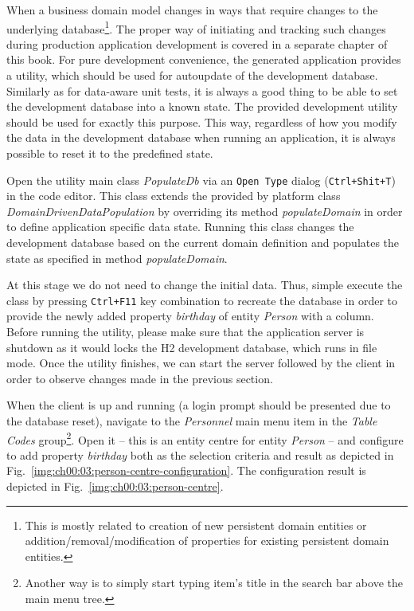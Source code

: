   When a business domain model changes in ways that require changes to the underlying database\footnote{This is mostly related to creation of new persistent domain entities or addition/removal/modification of properties for existing persistent domain entities.}.
  The proper way of initiating and tracking such changes during production application development is covered in a separate chapter of this book.
  For pure development convenience, the generated application provides a utility, which should be used for autoupdate of the development database.
  Similarly as for data-aware unit tests, it is always a good thing to be able to set the development database into a known state.
  The provided development utility should be used for exactly this purpose.
  This way, regardless of how you modify the data in the development database when running an application, it is always possible to reset it to the predefined state.

  Open the utility main class \emph{PopulateDb} via an \texttt{Open Type} dialog (\texttt{Ctrl+Shit+T}) in the code editor.
  This class extends the provided by platform class \emph{DomainDrivenDataPopulation} by overriding its method \emph{populateDomain} in order to define application specific data state.
  Running this class changes the development database based on the current domain definition and populates the state as specified in method \emph{populateDomain}.

  At this stage we do not need to change the initial data.
  Thus, simple execute the class by pressing \texttt{Ctrl+F11} key combination to recreate the database in order to provide the newly added property \emph{birthday} of entity \emph{Person} with a column.
  Before running the utility, please make sure that the application server is shutdown as it would locks the H2 development database, which runs in file mode.
  Once the utility finishes, we can start the server followed by the client in order to observe changes made in the previous section.

  When the client is up and running (a login prompt should be presented due to the database reset), navigate to the \emph{Personnel} main menu item in the \emph{Table Codes} group\footnote{Another way is to simply start typing item's title in the search bar above the main menu tree.}.
  Open it -- this is an entity centre for entity \emph{Person} -- and configure to add property \emph{birthday} both as the selection criteria and result as depicted in Fig.~\ref{img:ch00:03:person-centre-configuration}.
  The configuration result is depicted in Fig.~\ref{img:ch00:03:person-centre}.

